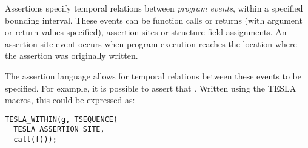 Assertions specify temporal relations between \emph{program events}, within a
specified bounding interval. These events can be function calls or returns (with
argument or return values specified), assertion sites or structure field
assignments. An assertion site event occurs when program execution reaches the
location where the assertion was originally written.

The assertion language allows for temporal relations between these events to be
specified. For example, it is possible to assert that . Written using the TESLA macros, this could be expressed as:

\begin{verbatim}
TESLA_WITHIN(g, TSEQUENCE(
  TESLA_ASSERTION_SITE,
  call(f)));
\end{verbatim}
